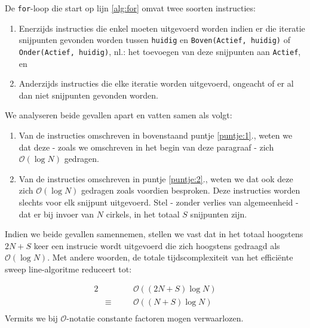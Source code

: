 \documentclass[12pt]{article}
\begin{document}
De \texttt{for}-loop die start op lijn \ref{alg:for} omvat twee soorten instructies: 
\begin{enumerate}
	\item Enerzijds instructies die enkel moeten uitgevoerd worden indien er die iteratie snijpunten gevonden worden tussen \texttt{huidig} en \texttt{Boven(Actief, huidig)} of \texttt{Onder(Actief, huidig)}, nl.: het toevoegen van deze snijpunten aan \texttt{Actief}, en \label{puntje:1}
	\item Anderzijds instructies die elke iteratie worden uitgevoerd, ongeacht of er al dan niet snijpunten gevonden worden.\label{puntje:2}
\end{enumerate}
We analyseren beide gevallen apart en vatten samen als volgt:
\begin{enumerate}
	\item Van de instructies omschreven in bovenstaand puntje \ref{puntje:1}., weten we dat deze - zoals we omschreven in het begin van deze paragraaf - zich $\mathcal{O}(\log N)$ gedragen. %
	\item Van de instructies omschreven in puntje \ref{puntje:2}., weten we dat ook deze zich $\mathcal{O}(\log N)$ gedragen zoals voordien besproken. Deze instructies worden slechts voor elk snijpunt uitgevoerd. Stel - zonder verlies van algemeenheid - dat er bij invoer van $N$ cirkels, in het totaal $S$ snijpunten zijn.%
\end{enumerate}
Indien we beide gevallen samennemen, stellen we vast dat in het totaal hoogstens $2N+S$ keer een instrucie wordt uitgevoerd die zich hoogstens gedraagd als $\mathcal{O}(\log N)$. Met andere woorden, de totale tijdscomplexiteit van het efficiënte sweep line-algoritme reduceert tot:

\begin{alignat*}{2}
& &&\mathcal{O}((2N+S)\log N) \\
&\equiv\quad && \mathcal{O}((N+S)\log N)\\
\end{alignat*}
Vermits we bij $\mathcal{O}$-notatie constante factoren mogen verwaarlozen.
\end{document}
